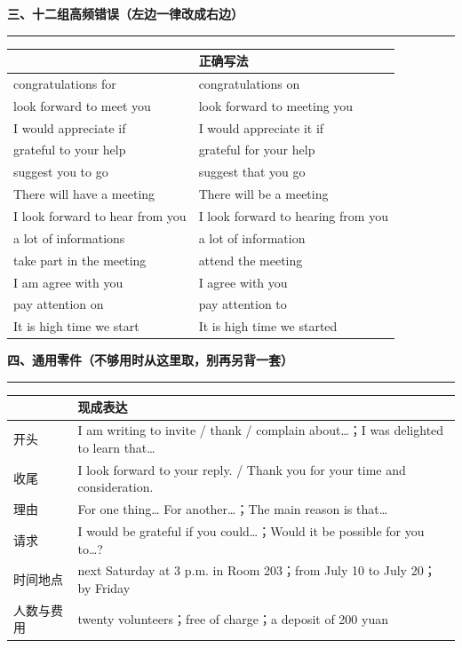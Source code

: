 \documentclass[11pt,a4paper]{ctexart}
\begin{document}
\vspace{12pt}
{\color{accent}\bfseries 三、十二组高频错误（左边一律改成右边）}\par
{\color{rule}\rule{\linewidth}{0.5pt}}\par\vspace{3pt}
{\footnotesize
\begin{tabularx}{\linewidth}{@{}>{\raggedright\arraybackslash}X>{\raggedright\arraybackslash}X@{}}
\toprule
{\color{hot}\bfseries 错误写法} & {\color{accent}\bfseries 正确写法} \\
\midrule
congratulations for & congratulations on \\
look forward to meet you & look forward to meeting you \\
I would appreciate if & I would appreciate it if \\
grateful to your help & grateful for your help \\
suggest you to go & suggest that you go \\
There will have a meeting & There will be a meeting \\
I look forward to hear from you & I look forward to hearing from you \\
a lot of informations & a lot of information \\
take part in the meeting & attend the meeting \\
I am agree with you & I agree with you \\
pay attention on & pay attention to \\
It is high time we start & It is high time we started \\
\bottomrule
\end{tabularx}}\par

\vspace{12pt}
{\color{accent}\bfseries 四、通用零件（不够用时从这里取，别再另背一套）}\par
{\color{rule}\rule{\linewidth}{0.5pt}}\par\vspace{4pt}
{\footnotesize
\begin{tabularx}{\linewidth}{@{}>{\raggedright\arraybackslash}p{2.1cm}X@{}}
\toprule
{\color{accent}\bfseries 功能} & {\color{accent}\bfseries 现成表达} \\
\midrule
开头 & I am writing to invite / thank / complain about…；I was delighted to learn that… \\
收尾 & I look forward to your reply. / Thank you for your time and consideration. \\
理由 & For one thing… For another…；The main reason is that… \\
请求 & I would be grateful if you could…；Would it be possible for you to…? \\
时间地点 & next Saturday at 3 p.m. in Room 203；from July 10 to July 20；by Friday \\
人数与费用 & twenty volunteers；free of charge；a deposit of 200 yuan \\
\bottomrule
\end{tabularx}}\par
\end{document}
